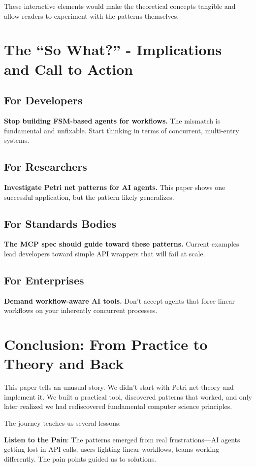 \documentclass[11pt,a4paper]{article}
\begin{document}
These interactive elements would make the theoretical concepts tangible and allow readers to experiment with the patterns themselves.

\section{The ``So What?'' - Implications and Call to Action}

\subsection{For Developers}
\textbf{Stop building FSM-based agents for workflows.} The mismatch is fundamental and unfixable. Start thinking in terms of concurrent, multi-entry systems.

\subsection{For Researchers}
\textbf{Investigate Petri net patterns for AI agents.} This paper shows one successful application, but the pattern likely generalizes.

\subsection{For Standards Bodies}
\textbf{The MCP spec should guide toward these patterns.} Current examples lead developers toward simple API wrappers that will fail at scale.

\subsection{For Enterprises}
\textbf{Demand workflow-aware AI tools.} Don't accept agents that force linear workflows on your inherently concurrent processes.

\section{Conclusion: From Practice to Theory and Back}

This paper tells an unusual story. We didn't start with Petri net theory and implement it. We built a practical tool, discovered patterns that worked, and only later realized we had rediscovered fundamental computer science principles.

The journey teaches us several lessons:

\textbf{Listen to the Pain}: The patterns emerged from real frustrations—AI agents getting lost in API calls, users fighting linear workflows, teams working differently. The pain points guided us to solutions.
\end{document}
